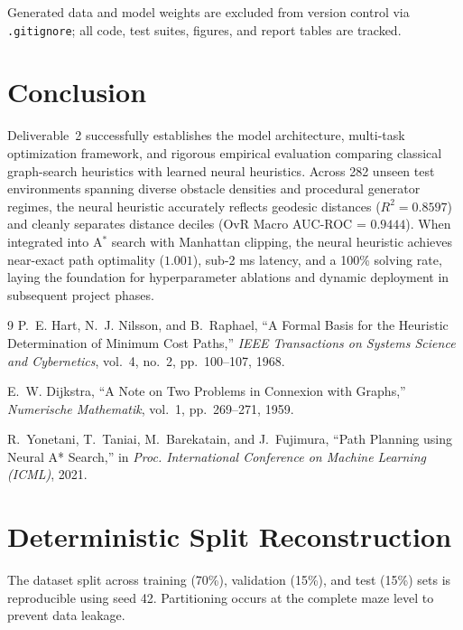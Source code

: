 \documentclass[11pt]{article}
\begin{document}
Generated data and model weights are excluded from version control via
\texttt{.gitignore}; all code, test suites, figures, and report tables are tracked.

\section{Conclusion}
Deliverable~2 successfully establishes the model architecture, multi-task optimization
framework, and rigorous empirical evaluation comparing classical graph-search heuristics
with learned neural heuristics. Across 282 unseen test environments spanning diverse obstacle
densities and procedural generator regimes, the neural heuristic accurately reflects geodesic
distances ($R^2 = 0.8597$) and cleanly separates distance deciles (OvR Macro AUC-ROC = $0.9444$).
When integrated into A$^\ast$ search with Manhattan clipping, the neural heuristic achieves
near-exact path optimality ($1.001$), sub-2 ms latency, and a 100\% solving rate, laying the
foundation for hyperparameter ablations and dynamic deployment in subsequent project phases.

\begin{thebibliography}{9}
P.~E. Hart, N.~J. Nilsson, and B.~Raphael,
``A Formal Basis for the Heuristic Determination of Minimum Cost Paths,''
\emph{IEEE Transactions on Systems Science and Cybernetics}, vol.~4, no.~2, pp.~100--107, 1968.

E.~W. Dijkstra,
``A Note on Two Problems in Connexion with Graphs,''
\emph{Numerische Mathematik}, vol.~1, pp.~269--271, 1959.

R.~Yonetani, T.~Taniai, M.~Barekatain, and J.~Fujimura,
``Path Planning using Neural A* Search,''
in \emph{Proc. International Conference on Machine Learning (ICML)}, 2021.
\end{thebibliography}

\appendix

\section{Deterministic Split Reconstruction}
\label{app:split}
The dataset split across training (70\%), validation (15\%), and test (15\%) sets is
reproducible using seed 42. Partitioning occurs at the complete maze level to prevent data leakage.
\end{document}
